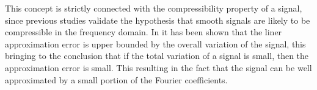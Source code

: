 This concept is strictly connected with the compressibility property of a signal, since previous studies validate the hypothesis that smooth signals are likely to be compressible in the frequency domain. In \cite{Zhu2012} it has been shown that the liner approximation error is upper bounded by the overall variation of the signal, this bringing to the conclusion that if the total variation of a signal is small, then the approximation error is small. This resulting in the fact that the signal can be well approximated by a small portion of the Fourier coefficients.
